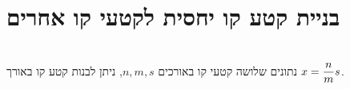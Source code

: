 

\section{בניית קטע קו יחסית לקטעי קו אחרים}\label{s.relative-straight}

\begin{theorem}\label{thm.three-lines}\mbox{}\\
נתונים שלושה קטעי קו באורכים
$n, m, s$,
ניתן לבנות קטע קו באורך
$x=\displaystyle\frac{n}{m}s$.
\end{theorem}

